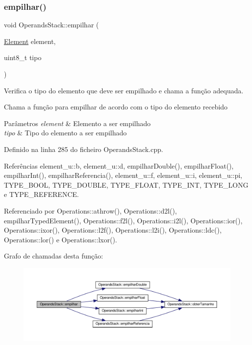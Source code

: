 \subsubsection{\texorpdfstring{empilhar()}{empilhar()}}
{\footnotesize\ttfamily void Operands\+Stack\+::empilhar (\begin{DoxyParamCaption}\item[{\hyperlink{BasicTypes_8h_a8132f4f0515064141e31e606660df561}{Element}}]{element,  }\item[{uint8\+\_\+t}]{tipo }\end{DoxyParamCaption})}



Verifica o tipo do elemento que deve ser empilhado e chama a função adequada. 

Chama a função para empilhar de acordo com o tipo do elemento recebido


\begin{DoxyParams}{Parâmetros}
{\em element} & Elemento a ser empilhado \\
\hline
{\em tipo} & Tipo do elemento a ser empilhado \\
\hline
\end{DoxyParams}


Definido na linha 285 do ficheiro Operands\+Stack.\+cpp.



Referências element\+\_\+u\+::b, element\+\_\+u\+::d, empilhar\+Double(), empilhar\+Float(), empilhar\+Int(), empilhar\+Referencia(), element\+\_\+u\+::f, element\+\_\+u\+::i, element\+\_\+u\+::pi, T\+Y\+P\+E\+\_\+\+B\+O\+OL, T\+Y\+P\+E\+\_\+\+D\+O\+U\+B\+LE, T\+Y\+P\+E\+\_\+\+F\+L\+O\+AT, T\+Y\+P\+E\+\_\+\+I\+NT, T\+Y\+P\+E\+\_\+\+L\+O\+NG e T\+Y\+P\+E\+\_\+\+R\+E\+F\+E\+R\+E\+N\+CE.



Referenciado por Operations\+::athrow(), Operations\+::d2l(), empilhar\+Typed\+Element(), Operations\+::f2l(), Operations\+::i2l(), Operations\+::ior(), Operations\+::ixor(), Operations\+::l2f(), Operations\+::l2i(), Operations\+::ldc(), Operations\+::lor() e Operations\+::lxor().

Grafo de chamadas desta função\+:\nopagebreak
\begin{figure}[H]
\begin{center}
\leavevmode
\includegraphics[width=350pt]{classOperandsStack_a50b642d5ff6a7a1f56b8cfc75bde1192_cgraph}
\end{center}
\end{figure}
\mbox{\label{classOperandsStack_aca2be3100b76689949f029196a893712}} 
